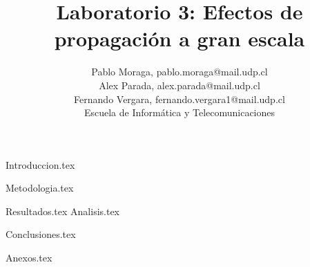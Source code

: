 \documentclass[lettersize,journal]{IEEEtran}
\begin{document}
\title{Laboratorio 3: Efectos de propagación a gran escala }
\author{Pablo Moraga, pablo.moraga@mail.udp.cl  \\
Alex Parada, alex.parada@mail.udp.cl \\
Fernando Vergara, fernando.vergara1@mail.udp.cl \\

Escuela de Informática y Telecomunicaciones \\ 
}



\maketitle

{Introduccion.tex}

{Metodologia.tex}

{Resultados.tex}
{Analisis.tex}

{Conclusiones.tex}

{Anexos.tex}

    
\printbibliography
\end{document}
